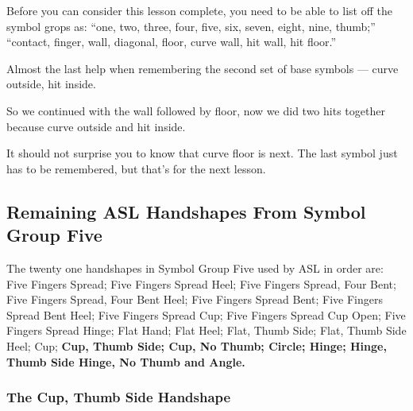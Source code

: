 \documentclass{article}
\begin{document}
Before you can consider this lesson complete, you need to be able to list off the symbol grops as:
``one, two, three, four, five, six, seven, eight, nine, thumb;''
``contact, finger, wall, diagonal, floor, curve wall, hit wall, hit floor.''

Almost the last help when remembering the second set of base symbols --- curve outside, hit inside.

So we continued with the wall followed by floor, now we did two hits together because curve outside and hit inside.

It should not surprise you to know that curve floor is next.
The last symbol just has to be remembered, but that's for the next lesson.

\subsection{Remaining ASL Handshapes From Symbol Group Five}

The twenty one handshapes in Symbol Group Five used by ASL in order are:
Five Fingers Spread;
Five Fingers Spread Heel;
Five Fingers Spread, Four Bent;
Five Fingers Spread, Four Bent Heel;
Five Fingers Spread Bent;
Five Fingers Spread Bent Heel;
Five Fingers Spread Cup;
Five Fingers Spread Cup Open;
Five Fingers Spread Hinge;
Flat Hand;
Flat Heel;
Flat, Thumb Side;
Flat, Thumb Side Heel;
Cup;
{\bf
Cup, Thumb Side;
Cup, No Thumb;
Circle;
Hinge;
Hinge, Thumb Side
Hinge, No Thumb
and Angle.
}

\subsubsection{The Cup, Thumb Side Handshape}
\end{document}
